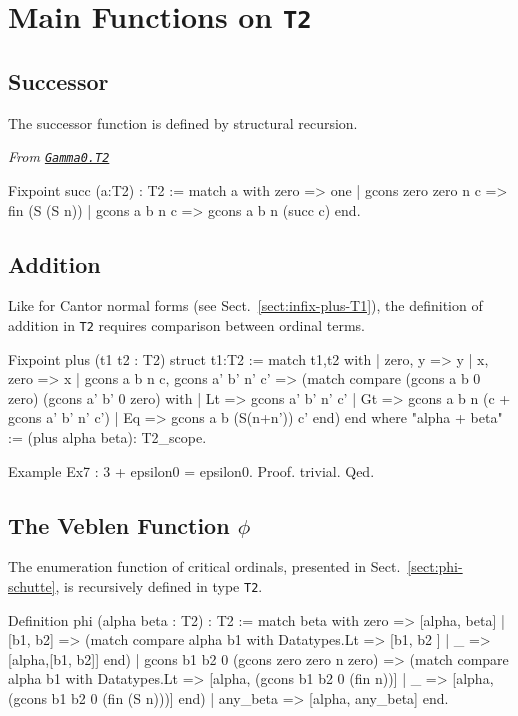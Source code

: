 {\section{Main Functions on \texttt{T2}}

\subsection{Successor}
The successor function is defined by structural recursion.

\noindent\emph{From \href{../theories/html/hydras.Gamma0.T2.html\#succ}%
{\texttt{Gamma0.T2}}}
\begin{Coqsrc}
Fixpoint succ (a:T2) : T2 :=
 match a with zero => one
             | gcons zero zero n c => fin (S (S n))
             | gcons a b n c => gcons a b n (succ c)
 end.
\end{Coqsrc}

\subsection{Addition}

Like for Cantor normal forms (see Sect.~\ref{sect:infix-plus-T1}),  the definition of addition in \texttt{T2}  requires comparison between ordinal terms.


\begin{Coqsrc}
Fixpoint plus (t1 t2 : T2) {struct t1}:T2 :=
  match t1,t2 with
  |  zero, y  => y
  |  x, zero => x
  |  gcons a b n c, gcons a' b' n' c' =>
     (match compare (gcons a b 0 zero)
                    (gcons a' b' 0 zero) with
      | Lt => gcons a' b' n' c'
      | Gt => gcons a b n (c + gcons a' b' n' c')
      | Eq => gcons a b (S(n+n')) c'
      end)
  end
where "alpha + beta" := (plus alpha beta): T2_scope.
\end{Coqsrc}

\begin{Coqsrc}
Example Ex7 : 3 + epsilon0 = epsilon0.
Proof. trivial. Qed.
\end{Coqsrc}

\subsection{The Veblen Function \texorpdfstring{$\phi$}{\texttt{phi}}}

The enumeration function of critical ordinals, presented in Sect.~\vref{sect:phi-schutte}, is recursively defined in type \texttt{T2}.

\begin{Coqsrc}
Definition  phi (alpha beta : T2) : T2 :=
  match beta with zero => [alpha, beta] 
             | [b1, b2] => 
               (match compare alpha b1
                with Datatypes.Lt => [b1, b2 ]
                | _ => [alpha,[b1, b2]]
                end)
             | gcons b1 b2 0 (gcons zero zero  n zero) => 
               (match compare alpha b1
                with  Datatypes.Lt => 
                      [alpha, (gcons b1 b2 0 (fin n))]
                | _ =>  [alpha, (gcons b1 b2 0 (fin (S n)))]
                end)
             | any_beta => [alpha, any_beta]
  end.
\end{Coqsrc}

}
